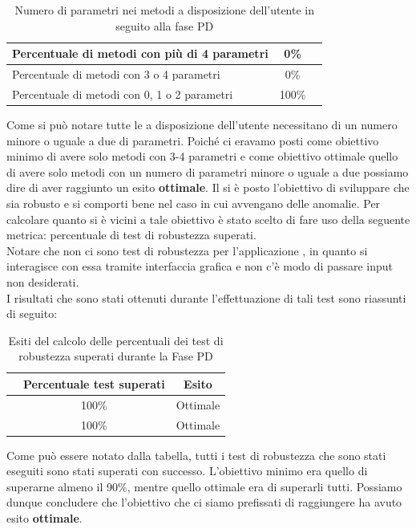 				\begin{table}[H]
					\centering
					\begin{tabu}{| l | c | c |}
						\hline
						Percentuale di metodi con più di 4 parametri   & 0\% \\ \hline
						Percentuale di metodi con 3 o 4 parametri      & 0\% \\ \hline
						Percentuale di metodi con 0, 1 o 2 parametri   & 100\% \\ \hline
					\end{tabu}
					\caption{Numero di parametri nei metodi a disposizione dell'utente in seguito alla fase PD}
				\end{table}
				Come si può notare tutte le  a disposizione dell'utente necessitano di un numero minore o uguale a due di parametri. Poiché ci eravamo posti come obiettivo minimo di avere solo metodi con 3-4 parametri e come obiettivo ottimale quello di avere solo metodi con un numero di parametri minore o uguale a due possiamo dire di aver raggiunto un esito \textbf{ottimale}.
				Il \groupname si è posto l'obiettivo di sviluppare  che sia robusto e si comporti bene nel caso in cui avvengano delle anomalie. Per calcolare quanto si è vicini a tale obiettivo è stato scelto di fare uso della seguente metrica: percentuale di test di robustezza superati.\\
				Notare che non ci sono test di robustezza per l'applicazione , in quanto si interagisce con essa tramite interfaccia grafica e non c'è modo di passare input non desiderati.\\
				I risultati che sono stati ottenuti durante l'effettuazione di tali test sono riassunti di seguito:
				\begin{table}[H]
					\centering
					\begin{tabu}{| l | c | c |}
						\hline
						      & Percentuale test superati   & Esito     \\ \hline \hline
							      & 100\%                       & Ottimale  \\ \hline
							      & 100\%                       & Ottimale  \\ \hline
					\end{tabu}
					\caption{Esiti del calcolo delle percentuali dei test di robustezza superati durante la Fase PD}
				\end{table}
				Come può essere notato dalla tabella, tutti i test di robustezza che sono stati eseguiti sono stati superati con successo. L'obiettivo minimo era quello di superarne almeno il 90\%, mentre quello ottimale era di superarli tutti. Possiamo dunque concludere che l'obiettivo che ci siamo prefissati di raggiungere ha avuto esito \textbf{ottimale}.
